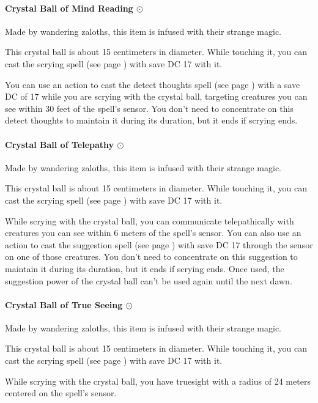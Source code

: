 \paragraph{Crystal Ball of Mind Reading $\odot$}
    Made by wandering zaloths, this item is infused with their strange magic.

    This crystal ball is about 15 centimeters in diameter.
    While touching it, you can cast the scrying spell (see page \pageref{spell::scrying}) with save DC 17 with it.

    You can use an action to cast the detect thoughts spell (see page \pageref{spell::detectthoughts}) with a save DC of 17 while you are scrying with the crystal ball, targeting creatures you can see within 30 feet of the spell's sensor.
    You don't need to concentrate on this detect thoughts to maintain it during its duration, but it ends if scrying ends.
\paragraph{Crystal Ball of Telepathy $\odot$}
    Made by wandering zaloths, this item is infused with their strange magic.

    This crystal ball is about 15 centimeters in diameter.
    While touching it, you can cast the scrying spell (see page \pageref{spell::scrying}) with save DC 17 with it.

    While scrying with the crystal ball, you can communicate telepathically with creatures you can see within 6 meters of the spell's sensor.
    You can also use an action to cast the suggestion spell (see page \pageref{spell::suggestion}) with save DC 17 through the sensor on one of those creatures.
    You don't need to concentrate on this suggestion to maintain it during its duration, but it ends if scrying ends.
    Once used, the suggestion power of the crystal ball can't be used again until the next dawn.
\paragraph{Crystal Ball of True Seeing $\odot$}
    Made by wandering zaloths, this item is infused with their strange magic.

    This crystal ball is about 15 centimeters in diameter.
    While touching it, you can cast the scrying spell (see page \pageref{spell::scrying}) with save DC 17 with it.

    While scrying with the crystal ball, you have truesight with a radius of 24 meters centered on the spell's sensor.
